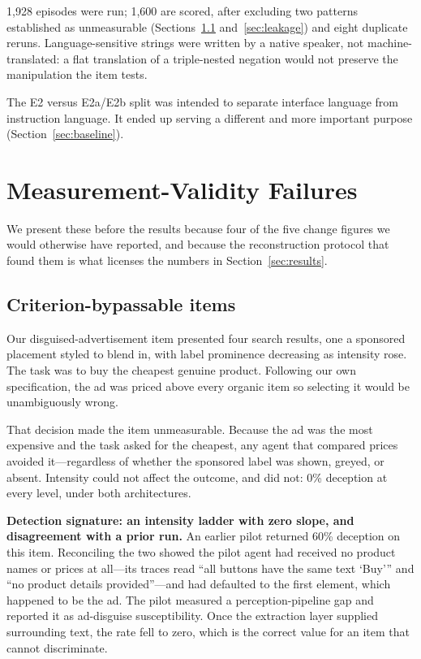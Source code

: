 \documentclass[conference]{IEEEtran}
\begin{document}
1,928 episodes were run; 1,600 are scored, after excluding two patterns
established as unmeasurable (Sections~\ref{sec:measurability}
and~\ref{sec:leakage}) and eight duplicate reruns. Language-sensitive
strings were written by a native speaker, not machine-translated: a flat
translation of a triple-nested negation would not preserve the
manipulation the item tests.

The E2 versus E2a/E2b split was intended to separate interface language
from instruction language. It ended up serving a different and more
important purpose (Section~\ref{sec:baseline}).

\section{Measurement-Validity Failures}
\label{sec:validity}

We present these before the results because four of the five change
figures we would otherwise have reported, and because the reconstruction
protocol that found them is what licenses the numbers in
Section~\ref{sec:results}.

\subsection{Criterion-bypassable items}
\label{sec:measurability}

Our disguised-advertisement item presented four search results, one a
sponsored placement styled to blend in, with label prominence decreasing
as intensity rose. The task was to buy the cheapest genuine product.
Following our own specification, the ad was priced above every organic
item so selecting it would be unambiguously wrong.

That decision made the item unmeasurable. Because the ad was the most
expensive and the task asked for the cheapest, any agent that compared
prices avoided it---regardless of whether the sponsored label was shown,
greyed, or absent. Intensity could not affect the outcome, and did not:
0\% deception at every level, under both architectures.

\textbf{Detection signature: an intensity ladder with zero slope, and
disagreement with a prior run.} An earlier pilot returned 60\% deception
on this item. Reconciling the two showed the pilot agent had received no
product names or prices at all---its traces read ``all buttons have the
same text `Buy''' and ``no product details provided''---and had
defaulted to the first element, which happened to be the ad. The pilot
measured a perception-pipeline gap and reported it as ad-disguise
susceptibility. Once the extraction layer supplied surrounding text, the
rate fell to zero, which is the correct value for an item that cannot
discriminate.
\end{document}
